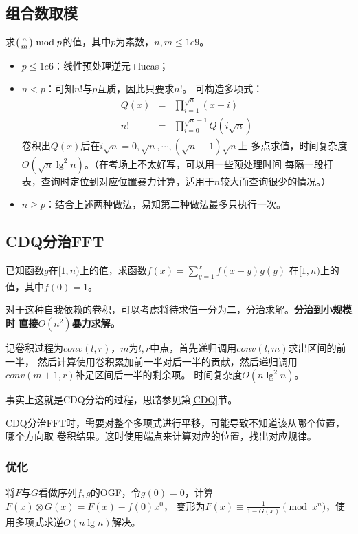 \subsection{组合数取模}

求$\left(n \atop m\right) \bmod{p}$的值，其中$p$为素数，$n,m\leq 1e9$。

\begin{itemize}
    \item $p\leq 1e6$：线性预处理逆元+lucas；
    \item $n<p$：可知$n!$与$p$互质，因此只要求$n!$。
    可构造多项式：
    \begin{eqnarray*}
        Q(x)&=&\prod_{i=1}^{\sqrt{n}}{(x+i)}\\
        n!&=&\prod_{i=0}^{\sqrt{n}-1}{Q(i\sqrt{n})}
    \end{eqnarray*}
    卷积出$Q(x)$后在$i\sqrt{n}=0,\sqrt{n},\cdots,(\sqrt{n}-1)\sqrt{n}$上
    多点求值，时间复杂度\\$O(\sqrt{n}\lg^2 n)$。（在考场上不太好写，可以用一些预处理时间
    每隔一段打表，查询时定位到对应位置暴力计算，适用于$n$较大而查询很少的情况。）
    \item $n\geq p$：结合上述两种做法，易知第二种做法最多只执行一次。
\end{itemize}

\subsection{CDQ分治FFT}
已知函数$g$在$[1,n)$上的值，求函数$f(x)=\displaystyle \sum_{y=1}^x{f(x-y)g(y)}$
在$[1,n)$上的值，其中$f(0)=1$。

对于这种自我依赖的卷积，可以考虑将待求值一分为二，分治求解。{\bfseries 分治到小规模时
直接$O(n^2)$暴力求解。}

记卷积过程为$conv(l,r)$，$m$为$l,r$中点，首先递归调用$conv(l,m)$求出区间的前一半，
然后计算使用卷积累加前一半对后一半的贡献，然后递归调用$conv(m+1,r)$补足区间后一半的剩余项。
时间复杂度$O(n\lg^2 n)$。

事实上这就是CDQ分治的过程，思路参见第\ref{CDQ}节。

CDQ分治FFT时，需要对整个多项式进行平移，可能导致不知道该从哪个位置，哪个方向取
卷积结果。这时使用端点来计算对应的位置，找出对应规律。
\subsubsection{优化}
将$F$与$G$看做序列$f,g$的OGF，令$g(0)=0$，计算$F(x)\otimes G(x)=F(x)-f(0)x^0$，
变形为$F(x)\equiv \frac{1}{1-G(x)} \pmod{x^n}$，使用多项式求逆$O(n\lg n)$解决。


